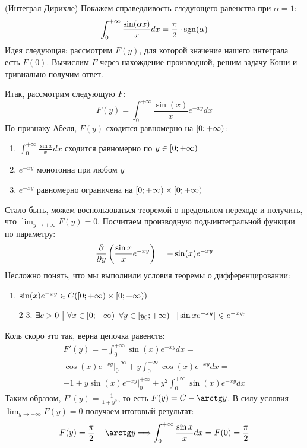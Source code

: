 \begin{example} (Интеграл Дирихле)
	Покажем справедливость следующего равенства при $\alpha = 1$:
	\[
		\int_0^{+\infty} \frac{\sin(\alpha x)}{x}dx = \frac{\pi}{2} \cdot \operatorname{sgn}(\alpha)
	\]
	Идея следующая: рассмотрим $F(y)$, для которой значение нашего интеграла есть $F(0)$. Вычислим $F$ через нахождение производной, решим задачу Коши и тривиально получим ответ.
	
	Итак, рассмотрим следующую $F$:
	\[
		F(y) = \int_0^{+\infty} \frac{\sin(x)}{x}e^{-xy}dx
	\]
	По признаку Абеля, $F(y)$ сходится равномерно на $\left[0; +\infty\right)$:
	\begin{enumerate}
		\item $\int_0^{+\infty} \frac{\sin x}{x}dx$ сходится равномерно по $y \in \left[0; +\infty\right)$
		
		\item $e^{-xy}$ монотонна при любом $y$
		
		\item $e^{-xy}$ равномерно ограничена на $\left[0; +\infty\right) \times \left[0; +\infty\right)$
	\end{enumerate}
	Стало быть, можем воспользоваться теоремой о предельном переходе и получить, что $\lim_{y \to +\infty} F(y) = 0$. Посчитаем производную подыинтегральной функции  по параметру:
	\[
		\frac{\partial }{\partial y}\left(\frac{\sin x}{x}e^{-xy}\right) = -\sin(x)e^{-xy}
	\]
	Несложно понять, что мы выполнили условия теоремы о дифференцировании:
	\begin{enumerate}
		\item $\sin(x)e^{-xy} \in C(\left[0; +\infty\right) \times \left[0; +\infty\right))$
		
		\item[2-3.] $\exists c > 0 \ \big|\  \forall x \in \left[0; +\infty\right)\ \forall y \in \left[y_0; +\infty\right)\ \ |\sin x e^{-xy}| \leqslant e^{-xy_0}$
	\end{enumerate}
	Коль скоро это так, верна цепочка равенств:
	\begin{multline*}
		F'(y) = -\int_0^{+\infty} \sin(x)e^{-xy}dx =
		\\
		\cos(x)e^{-xy}\Big|_0^{+\infty} + y\int_0^{+\infty} \cos(x)e^{-xy}dx =
		\\
		-1 + y\sin(x)e^{-xy}\Big|_0^{+\infty} + y^2\int_0^{+\infty} \sin(x)e^{-xy}dx
	\end{multline*}
	Таким образом, $F'(y) = \frac{-1}{1 + y^2}$, то есть $F(y) = C - \arctg y$. В силу условия $\lim_{y \to +\infty} F(y) = 0$ получаем итоговый результат:
	\[
		F(y) = \frac{\pi}{2} - \arctg y \Lora \int_0^{+\infty} \frac{\sin x}{x}dx = F(0) = \frac{\pi}{2}
	\]
\end{example}

